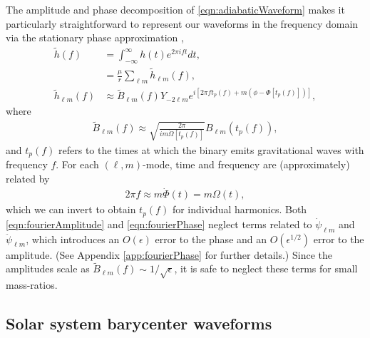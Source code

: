 \documentclass[%
 reprint,
 nofootinbib,
 amsmath,amssymb,
 aps,
 prd,
]{revtex4-2}
\begin{document}
The amplitude and phase decomposition of \eqref{eqn:adiabaticWaveform} makes it particularly straightforward to represent our waveforms in the frequency domain via the stationary phase approximation \cite{HughETC21},
\begin{subequations} \label{eqn:fourierH}
\begin{align}
    \tilde{h}(f) &= \int_{-\infty}^\infty h(t) e^{2\pi i f t} dt,
    \\ 
    &=  \frac{\mu}{r}\sum_{\ell m}\tilde{h}_{\ell m}(f),
    \\ 
    \tilde{h}_{\ell m}(f) & \approx \tilde{B}_{\ell m}(f) Y_{-2\ell m} e^{i[2\pi f t_p(f)+ m(\phi-\Phi[t_p(f)])]},
\end{align}
\end{subequations}
where
\begin{align} \label{eqn:fourierAmplitude}
    \tilde{B}_{\ell m}(f) \approx \sqrt{\frac{2\pi}{i m \dot{\Omega}[t_p(f)]}} {B}_{\ell m}(t_p(f)),
\end{align}
and $t_p(f)$ refers to the times at which the binary emits gravitational waves with frequency $f$. For each $(\ell, m)$-mode, time and frequency are (approximately) related by
\begin{align} \label{eqn:fourierPhase}
    2\pi f \approx m \dot{\Phi}(t) = m \Omega(t),
\end{align}
which we can invert to obtain $t_p(f)$ for individual harmonics. Both \eqref{eqn:fourierAmplitude} and \eqref{eqn:fourierPhase} neglect terms related to $\dot{\psi}_{\ell m}$ and $\ddot{\psi}_{\ell m}$, which introduces an $O(\epsilon)$ error to the phase and an $O(\epsilon^{1/2})$ error to the amplitude. (See Appendix \ref{app:fourierPhase} for further details.) Since the amplitudes scale as $\tilde{B}_{\ell m}(f) \sim 1/\sqrt{\epsilon}$, it is safe to neglect these terms for small mass-ratios.

\subsection{Solar system barycenter waveforms}
\end{document}
